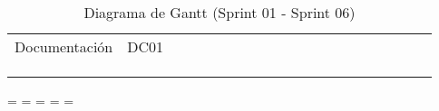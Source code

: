 \begin{longtable}[c]{llclllllllllllllllll}
        \multicolumn{1}{|l|}{Documentación}                                                   & \multicolumn{1}{l|}{DC01}                                                      & \multicolumn{1}{l|}{}                                                            & \multicolumn{1}{l|}{}                                                                &                                 &                                 &                                 &                                 &                                 &                                 &                                 &                                 &                                 &                                 &                                 &                                 &                                 &                                 & \multicolumn{1}{l|}{}                         &  \\ \cline{1-19}
        \multicolumn{4}{|l|}{}                                                                                                                                                                                                                                                                                                                           & \multicolumn{15}{l|}{}                                                                                                                                                                                                                                                                                                                                                                                                                                                                                                                    &  \\ \cline{1-19}
        \multicolumn{1}{|l|}{}                                                                & \multicolumn{1}{l|}{}                                                          & \multicolumn{1}{l|}{}                                                            & \multicolumn{1}{l|}{}                                                                &                                 &                                 &                                 &                                 &                                 &                                 &                                 &                                 &                                 &                                 &                                 &                                 &                                 &                                 & \multicolumn{1}{l|}{}                         &  \\ \cline{1-19}
        \caption{Diagrama de Gantt (Sprint 01 - Sprint 06)}
        \label{tab:Diagrama_gantt}\\
    \end{longtable}
\endgroup
\newpage
\paperwidth=\pdfpageheight
\paperheight=\pdfpagewidth
\pdfpageheight=\paperheight
\pdfpagewidth=\paperwidth
\headwidth=\textwidth

